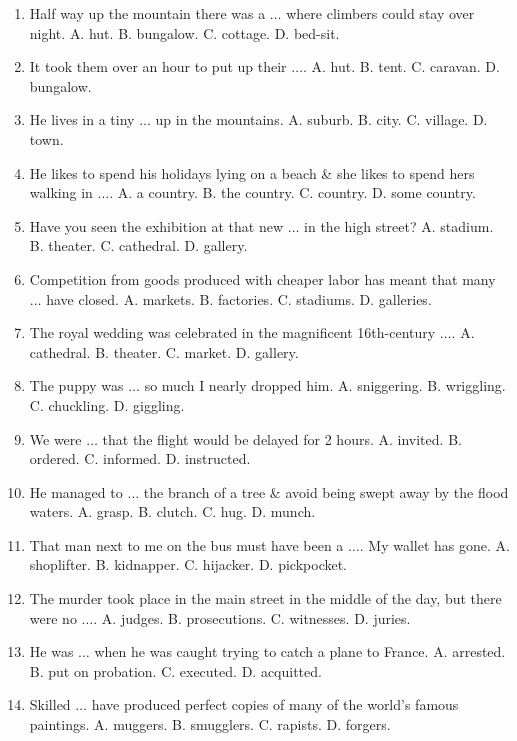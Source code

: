 \documentclass{article}
\numberwithin{equation}{section}
\begin{document}
\begin{enumerate}[leftmargin=2mm]
	\item Half way up the mountain there was a $\ldots$ where climbers could stay over night. {\sf A.} hut. {\sf B.} bungalow. {\sf C.} cottage. {\sf D.} bed-sit.
	\item It took them over an hour to put up their $\ldots$. {\sf A.} hut. {\sf B.} tent. {\sf C.} caravan. {\sf D.} bungalow.
	\item He lives in a tiny $\ldots$ up in the mountains. {\sf A.} suburb. {\sf B.} city. {\sf C.} village. {\sf D.} town.
	\item He likes to spend his holidays lying on a beach \& she likes to spend hers walking in $\ldots$. {\sf A.} a country. {\sf B.} the country. {\sf C.} country. {\sf D.} some country.
	\item Have you seen the exhibition at that new $\ldots$ in the high street? {\sf A.} stadium. {\sf B.} theater. {\sf C.} cathedral. {\sf D.} gallery.
	\item Competition from goods produced with cheaper labor has meant that many $\ldots$ have closed. {\sf A.} markets. {\sf B.} factories. {\sf C.} stadiums. {\sf D.} galleries.
	\item The royal wedding was celebrated in the magnificent 16th-century $\ldots$. {\sf A.} cathedral. {\sf B.} theater. {\sf C.} market. {\sf D.} gallery.
	\item The puppy was $\ldots$ so much I nearly dropped him. {\sf A.} sniggering. {\sf B.} wriggling. {\sf C.} chuckling. {\sf D.} giggling.
	\item We were $\ldots$ that the flight would be delayed for 2 hours. {\sf A.} invited. {\sf B.} ordered. {\sf C.} informed. {\sf D.} instructed.
	\item He managed to $\ldots$ the branch of a tree \& avoid being swept away by the flood waters. {\sf A.} grasp. {\sf B.} clutch. {\sf C.} hug. {\sf D.} munch.
	\item That man next to me on the bus must have been a $\ldots$. My wallet has gone. {\sf A.} shoplifter. {\sf B.} kidnapper. {\sf C.} hijacker. {\sf D.} pickpocket.
	\item The murder took place in the main street in the middle of the day, but there were no $\ldots$. {\sf A.} judges. {\sf B.} prosecutions. {\sf C.} witnesses. {\sf D.} juries.
	\item He was $\ldots$ when he was caught trying to catch a plane to France. {\sf A.} arrested. {\sf B.} put on probation. {\sf C.} executed. {\sf D.} acquitted.
	\item Skilled $\ldots$ have produced perfect copies of many of the world's famous paintings. {\sf A.} muggers. {\sf B.} smugglers. {\sf C.} rapists. {\sf D.} forgers.

\end{enumerate}
\end{document}
